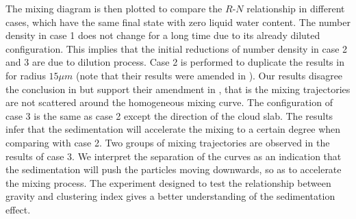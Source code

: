 The mixing diagram is then plotted to compare the $R$-$N$ relationship in
different cases, which have the same final state with zero liquid water
content. The number density in case 1 does not change for a long time due to
its already diluted configuration. This implies that the initial reductions of
number density in case 2 and 3 are due to dilution process. Case 2 is performed
to duplicate the results in \cite{Kumar2014Lagrangian} for radius $15\mu m$ (note that
their results were amended in \cite{Kumar2016Corr}). Our results disagree the
conclusion in \cite{Kumar2014Lagrangian} but support their amendment in \cite{Kumar2016Corr},
that is the mixing trajectories are not scattered around the homogeneous mixing
curve. The configuration of case 3 is the same as case 2 except the direction
of the cloud slab. The results infer that the sedimentation will accelerate the
mixing to a certain degree when comparing with case 2. Two groups of mixing
trajectories are observed in the results of case 3. We interpret the separation
of the curves as an indication that the sedimentation will push the particles
moving downwards, so as to accelerate the mixing process. The experiment
designed to test the relationship between gravity and clustering index gives a
better understanding of the sedimentation effect.
